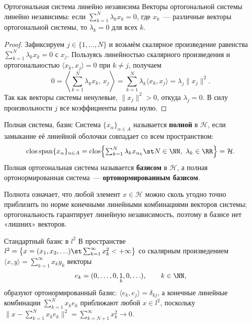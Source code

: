 \begin{Proposition}{Ортогональная система линейно независима}{}
	Векторы ортогональной системы линейно независимы: если $\sum_{k=1}^{N} \lambda_k x_k = 0$, где $x_k$~--- различные векторы ортогональной системы, то $\lambda_k = 0$ для всех $k$.
\end{Proposition}

\begin{proof}
	Зафиксируем $j \in \{1,\ldots,N\}$ и возьмём скалярное произведение равенства $\sum_{k=1}^{N}\lambda_k x_k = 0$ с $x_j$. Пользуясь линейностью скалярного произведения и ортогональностью $\langle x_k, x_j\rangle = 0$ при $k \neq j$, получаем
	\[
	0 = \left\langle \sum_{k=1}^{N} \lambda_k x_k,\, x_j \right\rangle
	= \sum_{k=1}^{N} \lambda_k \langle x_k, x_j \rangle
	= \lambda_j \|x_j\|^2.
	\]
	Так как векторы системы ненулевые, $\|x_j\|^2 > 0$, откуда $\lambda_j = 0$. В силу произвольности $j$ все коэффициенты равны нулю.
\end{proof}

\begin{Definition}{Полная система, базис}{}
	Система $\{x_\alpha\}_{\alpha \in A}$ называется \textbf{полной} в $\mathcal{H}$, если замыкание её линейной оболочки совпадает со всем пространством:
	\[
	\operatorname{clos}\operatorname{span}\{x_\alpha\}_{\alpha \in A}
	= \operatorname{clos}\Bigl\{ \textstyle\sum_{k=1}^{N} \lambda_k x_{\alpha_k} \st N \in \NN,\ \lambda_k \in \RR \Bigr\}
	= \mathcal{H}.
	\]
	Полная ортогональная система называется \textbf{базисом} в $\mathcal{H}$, а полная ортонормированная система~--- \textbf{ортонормированным базисом}.
\end{Definition}

\begin{Remark}{}{}
	Полнота означает, что любой элемент $x \in \mathcal{H}$ можно сколь угодно точно приблизить по норме конечными линейными комбинациями векторов системы; ортогональность гарантирует линейную независимость, поэтому в базисе нет «лишних» векторов.
\end{Remark}

\begin{Example}{Стандартный базис в $l^2$}{}
	В пространстве $l^2 = \bigl\{ x = (x_1, x_2, \ldots) \st \sum_{k=1}^{\infty} x_k^2 < +\infty \bigr\}$ со скалярным произведением $\langle x, y\rangle = \sum_{k=1}^{\infty} x_k y_k$ векторы
	\[
	e_k = (0, \ldots, 0, \underset{k}{1}, 0, \ldots), \qquad k \in \NN,
	\]
	образуют ортонормированный базис: $\langle e_k, e_j\rangle = \delta_{kj}$, а конечные линейные комбинации $\sum_{k=1}^{N} x_k e_k$ приближают любой $x \in l^2$, поскольку $\bigl\|x - \sum_{k=1}^{N} x_k e_k\bigr\|^2 = \sum_{k=N+1}^{\infty} x_k^2 \to 0$.
\end{Example}

